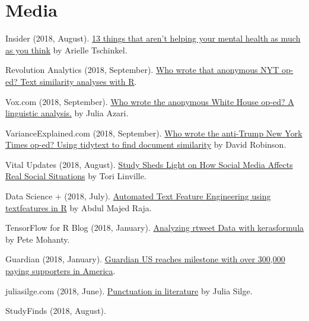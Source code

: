 \section{Media}
  \begin{bibenum}
    \item[] Insider (2018, August).
      \href{https://www.thisisinsider.com/things-that-are-not-helping-your-mental-health-2018-9}{13 things that aren't helping your mental health as much as you think} by Arielle Tschinkel.
    \item[] Revolution Analytics (2018, September).
      \href{http://blog.revolutionanalytics.com/2018/09/anonymous-nyt-op-ed.html}{Who wrote that anonymous NYT op-ed? Text similarity analyses with R}.
    \item[] Vox.com (2018, September).
      \href{https://www.vox.com/mischiefs-of-faction/2018/9/7/17830304/who-wrote-anonymous-white-house-op-ed}{Who wrote the anonymous White House op-ed? A linguistic analysis.} by Julia Azari.
    \item[] VarianceExplained.com (2018, September).
      \href{http://varianceexplained.org/r/op-ed-text-analysis/}{Who wrote the anti-Trump New York Times op-ed? Using tidytext to find document similarity} by David Robinson.
    \item[] Vital Updates (2018, August).
      \href{https://vitalupdates.com/study-sheds-light-on-how-social-media-affects-real-social-situations/}{Study Sheds Light on How Social Media Affects Real Social Situations} by Tori Linville.
    \item[] Data Science {+} (2018, July).
      \href{https://datascienceplus.com/automated-text-feature-engineering-using-textfeatures-in-r/}{Automated Text Feature Engineering using textfeatures in R} by Abdul Majed Raja.
    \item[] TensorFlow for R Blog (2018, January).
      \href{https://blogs.rstudio.com/tensorflow/posts/2018-01-24-analyzing-rtweet-data-with-kerasformula/}{Analyzing rtweet Data with kerasformula} by Pete Mohanty.
    \item[] Guardian (2018, January).
      \href{https://www.theguardian.com/gnm-press-office/2018/jan/26/guardian-us-reaches-milestone-with-over-300000-paying-supporters-in-america}{Guardian US reaches milestone with over 300,000 paying supporters in America}.
    \item[] juliasilge.com (2018, June).
      \href{https://juliasilge.com/blog/punctution-literature/}{Punctuation in literature} by Julia Silge.
    \item[] StudyFinds (2018, August).

\end{bibenum}
